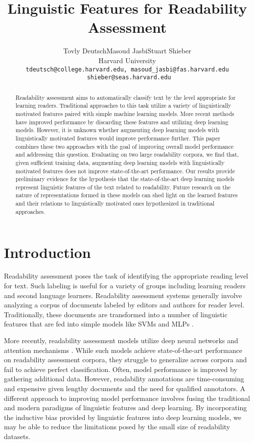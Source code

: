 \documentclass[11pt,a4paper]{article}
\title{Linguistic Features for Readability Assessment}
\author{Tovly Deutsch\qquad  Masoud Jasbi\qquad  Stuart Shieber \\ Harvard University \\ \texttt{tdeutsch@college.harvard.edu, masoud\_jasbi@fas.harvard.edu}\\\texttt{ shieber@seas.harvard.edu}\\
}
\theoremstyle{definition}
\begin{document}
\maketitle
\begin{abstract}
Readability assessment aims to automatically classify text by the level appropriate for learning readers. Traditional approaches to this task utilize a variety of linguistically motivated features paired with simple machine learning models. More recent methods have improved performance by discarding these features and utilizing deep learning models. However, it is unknown whether augmenting deep learning models with linguistically motivated features would improve performance further. This paper combines these two approaches with the goal of improving overall model performance and addressing this question. Evaluating on two large readability corpora, we find that, given sufficient training data, augmenting deep learning models with linguistically motivated features does not improve state-of-the-art performance. Our results provide preliminary evidence for the hypothesis that the state-of-the-art deep learning models represent linguistic features of the text related to readability. Future research on the nature of representations formed in these models can shed light on the learned features and their relations to linguistically motivated ones hypothesized in traditional approaches.
\end{abstract}

\section{Introduction}

Readability assessment poses the task of identifying the appropriate reading level for text. Such labeling is useful for a variety of groups including learning readers and second language learners. Readability assessment systems generally involve analyzing a corpus of documents labeled by editors and authors for reader level. Traditionally, these documents are transformed into a number of linguistic features that are fed into simple models like SVMs and MLPs \citep{schwarmReadingLevelAssessment2005, vajjalaImprovingAccuracyReadability2012}.

More recently, readability assessment models utilize deep neural networks and attention mechanisms \citep{martincSupervisedUnsupervisedNeural2019}. While such models achieve state-of-the-art performance on readability assessment corpora, they struggle to generalize across corpora and fail to achieve perfect classification. Often, model performance is improved by gathering additional data. However, readability annotations are time-consuming and expensive given lengthy documents and the need for qualified annotators. A different approach to improving model performance involves fusing the traditional and modern paradigms of linguistic features and deep learning. By incorporating the inductive bias provided by linguistic features into deep learning models, we may be able to reduce the limitations posed by the small size of readability datasets.
\end{document}
